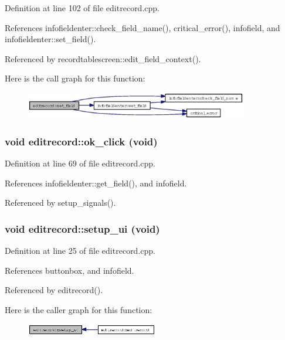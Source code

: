 Definition at line 102 of file editrecord.cpp.

References infofieldenter::check\_\-field\_\-name(), critical\_\-error(), infofield, and infofieldenter::set\_\-field().

Referenced by recordtablescreen::edit\_\-field\_\-context().

Here is the call graph for this function:\begin{figure}[H]
\begin{center}
\leavevmode
\includegraphics[width=275pt]{classeditrecord_7e6e9990768cb64f0e73e3f7b94fa5a1_cgraph}
\end{center}
\end{figure}
\subsubsection{\setlength{\rightskip}{0pt plus 5cm}void editrecord::ok\_\-click (void)\hspace{0.3cm}{\tt  [private, slot]}}\label{classeditrecord_be9bea72d91d0a91f6b4c09402329f76}




Definition at line 69 of file editrecord.cpp.

References infofieldenter::get\_\-field(), and infofield.

Referenced by setup\_\-signals().
\subsubsection{\setlength{\rightskip}{0pt plus 5cm}void editrecord::setup\_\-ui (void)\hspace{0.3cm}{\tt  [private]}}\label{classeditrecord_4b8901e5eb8582c21726876dc0bb435b}




Definition at line 25 of file editrecord.cpp.

References buttonbox, and infofield.

Referenced by editrecord().

Here is the caller graph for this function:\begin{figure}[H]
\begin{center}
\leavevmode
\includegraphics[width=163pt]{classeditrecord_4b8901e5eb8582c21726876dc0bb435b_icgraph}
\end{center}
\end{figure}
